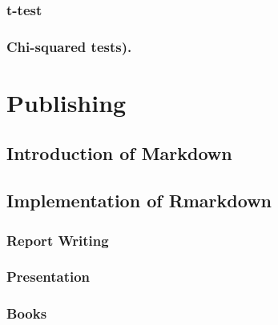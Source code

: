 \documentclass[
]{book}
\begin{document}
\hypertarget{t-test}{%
\subsection{t-test}\label{t-test}}

\hypertarget{chi-squared-tests.}{%
\subsection{Chi-squared tests).}\label{chi-squared-tests.}}

\hypertarget{publishing}{%
\chapter{Publishing}\label{publishing}}

\hypertarget{introduction-of-markdown}{%
\section{Introduction of Markdown}\label{introduction-of-markdown}}

\hypertarget{implementation-of-rmarkdown}{%
\section{Implementation of Rmarkdown}\label{implementation-of-rmarkdown}}

\hypertarget{report-writing}{%
\subsection{Report Writing}\label{report-writing}}

\hypertarget{presentation}{%
\subsection{Presentation}\label{presentation}}

\hypertarget{books}{%
\subsection{Books}\label{books}}

  
\end{document}
